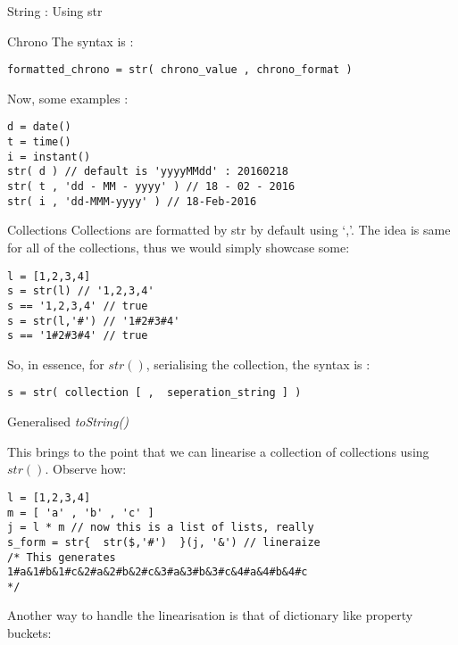 \begin{section}{String : Using str}
\begin{subsection}{Chrono}
The syntax is :

\begin{lstlisting}[style=JexlStyle]
formatted_chrono = str( chrono_value , chrono_format )
\end{lstlisting}

Now, some examples :

\begin{lstlisting}[style=JexlStyle]
d = date()
t = time()
i = instant()
str( d ) // default is 'yyyyMMdd' : 20160218
str( t , 'dd - MM - yyyy' ) // 18 - 02 - 2016
str( i , 'dd-MMM-yyyy' ) // 18-Feb-2016 
\end{lstlisting}

\end{subsection}

\begin{subsection}{Collections}
Collections are formatted by str by default using `,'.
The idea is same for all of the collections, thus we would simply showcase some:

\begin{lstlisting}[style=JexlStyle]
l = [1,2,3,4]
s = str(l) // '1,2,3,4'
s == '1,2,3,4' // true 
s = str(l,'#') // '1#2#3#4'
s == '1#2#3#4' // true 
\end{lstlisting}

So, in essence, for $str()$, serialising the collection, the syntax is :

\begin{lstlisting}[style=JexlStyle]
s = str( collection [ ,  seperation_string ] )
\end{lstlisting}

\end{subsection}

\begin{subsection}{Generalised \emph{toString()} }

This brings to the point that we can linearise a collection of collections using $str()$.
Observe how:

\begin{lstlisting}[style=JexlStyle]
l = [1,2,3,4]
m = [ 'a' , 'b' , 'c' ] 
j = l * m // now this is a list of lists, really 
s_form = str{  str($,'#')  }(j, '&') // lineraize 
/* This generates 
1#a&1#b&1#c&2#a&2#b&2#c&3#a&3#b&3#c&4#a&4#b&4#c
*/
\end{lstlisting}

Another way to handle the linearisation is that of dictionary like property buckets:


\end{subsection}
\end{section}
